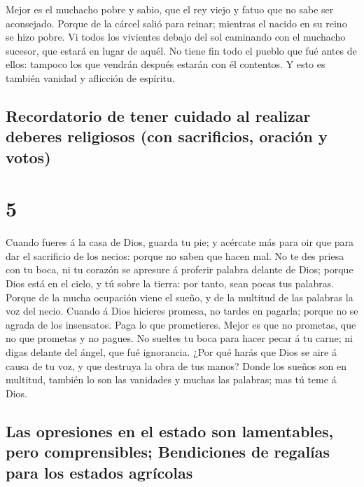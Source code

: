  Mejor es el muchacho pobre y sabio, que el rey viejo y
fatuo que no sabe ser aconsejado.  Porque de la cárcel
salió para reinar; mientras el nacido en su reino se hizo pobre.
 Vi todos los vivientes debajo del sol caminando con el
muchacho sucesor, que estará en lugar de aquél.  No tiene
fin todo el pueblo que fué antes de ellos: tampoco los que vendrán
después estarán con él contentos. Y esto es también vanidad y aflicción
de espíritu.

\hypertarget{recordatorio-de-tener-cuidado-al-realizar-deberes-religiosos-con-sacrificios-oraciuxf3n-y-votos}{%
\subsection{Recordatorio de tener cuidado al realizar deberes religiosos
(con sacrificios, oración y
votos)}\label{recordatorio-de-tener-cuidado-al-realizar-deberes-religiosos-con-sacrificios-oraciuxf3n-y-votos}}

\hypertarget{section-21-5}{%
\section{5}\label{section-21-5}}

 Cuando fueres á la casa de Dios, guarda tu pie; y
acércate más para oir que para dar el sacrificio de los necios: porque
no saben que hacen mal.  No te des priesa con tu boca, ni
tu corazón se apresure á proferir palabra delante de Dios; porque Dios
está en el cielo, y tú sobre la tierra: por tanto, sean pocas tus
palabras.  Porque de la mucha ocupación viene el sueño, y
de la multitud de las palabras la voz del necio.  Cuando á
Dios hicieres promesa, no tardes en pagarla; porque no se agrada de los
insensatos. Paga lo que prometieres.  Mejor es que no
prometas, que no que prometas y no pagues.  No sueltes tu
boca para hacer pecar á tu carne; ni digas delante del ángel, que fué
ignorancia. ¿Por qué harás que Dios se aire á causa de tu voz, y que
destruya la obra de tus manos?  Donde los sueños son en
multitud, también lo son las vanidades y muchas las palabras; mas tú
teme á Dios.

\hypertarget{las-opresiones-en-el-estado-son-lamentables-pero-comprensibles-bendiciones-de-regaluxedas-para-los-estados-agruxedcolas}{%
\subsection{Las opresiones en el estado son lamentables, pero
comprensibles; Bendiciones de regalías para los estados
agrícolas}\label{las-opresiones-en-el-estado-son-lamentables-pero-comprensibles-bendiciones-de-regaluxedas-para-los-estados-agruxedcolas}}

